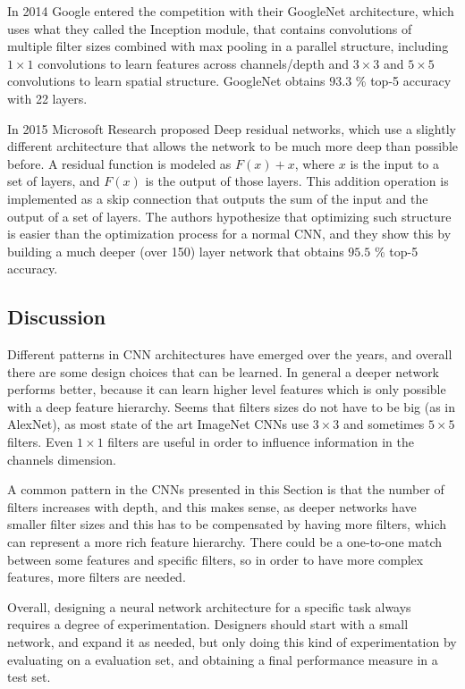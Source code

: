 In 2014 Google entered the competition with their GoogleNet \cite{szegedy2015going} architecture, which uses what they called the Inception module, that contains convolutions of multiple filter sizes combined with max pooling in a parallel structure, including $1 \times 1$ convolutions to learn features across channels/depth and $3 \times 3$ and $5 \times 5$ convolutions to learn spatial structure. GoogleNet obtains $93.3$ \% top-5 accuracy with 22 layers.

In 2015 Microsoft Research proposed Deep residual networks\cite{he2016deep}, which use a slightly different architecture that allows the network to be much more deep than possible before. A residual function is modeled as $F(x) + x$, where $x$ is the input to a set of layers, and $F(x)$ is the output of those layers. This addition operation is implemented as a skip connection that outputs the sum of the input and the output of a set of layers. The authors hypothesize that optimizing such structure is easier than the optimization process for a normal CNN, and they show this by building a much deeper (over 150) layer network that obtains $95.5$ \% top-5 accuracy.

\subsection{Discussion}

Different patterns in CNN architectures have emerged over the years, and overall there are some design choices that can be learned. In general a deeper network performs better, because it can learn higher level features which is only possible with a deep feature hierarchy. Seems that filters sizes do not have to be big (as in AlexNet), as most state of the art ImageNet CNNs use $3 \times 3$ and sometimes $5 \times 5$ filters. Even $1 \times 1$ filters are useful in order to influence information in the channels dimension.

A common pattern in the CNNs presented in this Section is that the number of filters increases with depth, and this makes sense, as deeper networks have smaller filter sizes and this has to be compensated by having more filters, which can represent a more rich feature hierarchy. There could be a one-to-one match between some features and specific filters, so in order to have more complex features, more filters are needed.

Overall, designing a neural network architecture for a specific task always requires a degree of experimentation. Designers should start with a small network, and expand it as needed, but only doing this kind of experimentation by evaluating on a evaluation set, and obtaining a final performance measure in a test set.

